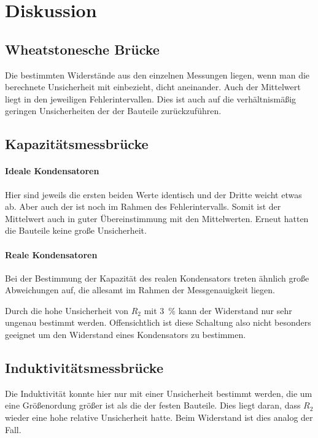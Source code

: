 \section{Diskussion}
\label{sec:Diskussion}

\subsection{Wheatstonesche Brücke}

Die bestimmten Widerstände aus den einzelnen Messungen liegen, wenn man die berechnete
Unsicherheit mit einbezieht, dicht aneinander. Auch der Mittelwert liegt in den jeweiligen
Fehlerintervallen. Dies ist auch auf die verhältnismäßig geringen Unsicherheiten der
der Bauteile zurückzuführen.

\subsection{Kapazitätsmessbrücke}

\paragraph{Ideale Kondensatoren}
Hier sind jeweils die ersten beiden Werte identisch und der Dritte weicht etwas ab.
Aber auch der ist noch im Rahmen des Fehlerintervalls. Somit ist der Mittelwert
auch in guter Übereinstimmung mit den Mittelwerten. Erneut hatten die Bauteile
keine große Unsicherheit.

\paragraph{Reale Kondensatoren}
Bei der Bestimmung der Kapazität des realen Kondensators treten ähnlich große Abweichungen
auf, die allesamt im Rahmen der Messgenauigkeit liegen.

Durch die hohe Unsicherheit von $R_2$ mit \SI{3}{\percent} kann der Widerstand
nur sehr ungenau bestimmt werden. Offensichtlich ist diese Schaltung also nicht
besonders geeignet um den Widerstand eines Kondensators zu bestimmen.

\subsection{Induktivitätsmessbrücke}

Die Induktivität konnte hier nur mit einer Unsicherheit bestimmt werden, die
um eine Größenordung größer ist als die der festen Bauteile. Dies liegt daran, dass
$R_2$ wieder eine hohe relative Unsicherheit hatte. Beim Widerstand ist dies analog
der Fall.

